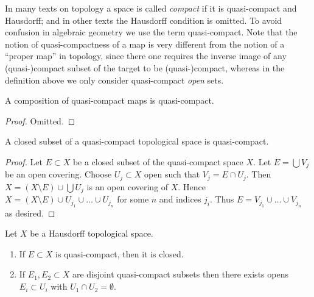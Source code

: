 \noindent
In many texts on topology a space is called {\it compact} if it
is quasi-compact and Hausdorff; and in other texts the Hausdorff
condition is omitted. To avoid confusion in algebraic geometry
we use the term quasi-compact. Note that the notion of quasi-compactness
of a map is very different from the notion of a ``proper map''
in topology, since there one requires the inverse image of any
(quasi-)compact subset of the target to be (quasi-)compact,
whereas in the definition above we only consider quasi-compact
{\it open} sets.

\begin{lemma}
\label{lemma-composition-quasi-compact}
A composition of quasi-compact maps is quasi-compact.
\end{lemma}

\begin{proof}
Omitted.
\end{proof}

\begin{lemma}
\label{lemma-closed-in-quasi-compact}
A closed subset of a quasi-compact topological space is quasi-compact.
\end{lemma}

\begin{proof}
Let $E \subset X$ be a closed subset of the quasi-compact space $X$.
Let $E = \bigcup V_j$ be an open covering. Choose $U_j \subset X$
open such that $V_j = E \cap U_j$. Then $X = (X \setminus E) \cup \bigcup U_j$
is an open covering of $X$. Hence
$X = (X \setminus E) \cup U_{j_1} \cup \ldots \cup U_{j_n}$ for some
$n$ and indices $j_i$. Thus $E = V_{j_1} \cup \ldots \cup V_{j_n}$
as desired.
\end{proof}

\begin{lemma}
\label{lemma-quasi-compact-in-Hausdorff}
Let $X$ be a Hausdorff topological space.
\begin{enumerate}
\item If $E \subset X$ is quasi-compact, then it is closed.
\item If $E_1, E_2 \subset X$ are disjoint quasi-compact subsets
then there exists opens $E_i \subset U_i$ with $U_1 \cap U_2 = \emptyset$.
\end{enumerate}
\end{lemma}


